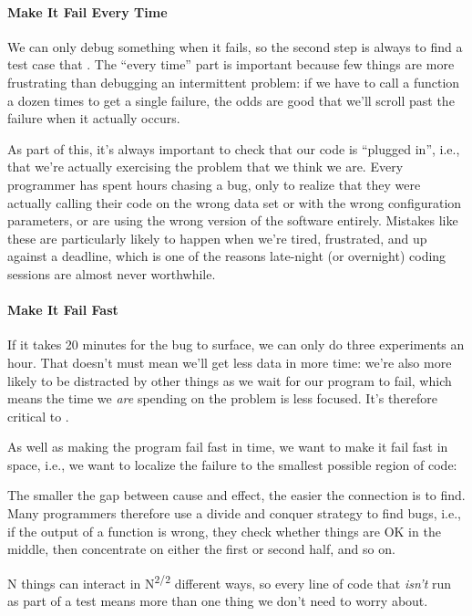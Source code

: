 \documentclass{book}
\begin{document}
\mbox{}\paragraph{Make It Fail Every Time}

We can only debug something when it fails, so the second step is always
to find a test case that
. The ``every time'' part is important because few things are more
frustrating than debugging an intermittent problem: if we have to call a
function a dozen times to get a single failure, the odds are good that
we'll scroll past the failure when it actually occurs.

As part of this, it's always important to check that our code is
``plugged in'', i.e., that we're actually exercising the problem that we
think we are. Every programmer has spent hours chasing a bug, only to
realize that they were actually calling their code on the wrong data set
or with the wrong configuration parameters, or are using the wrong
version of the software entirely. Mistakes like these are particularly
likely to happen when we're tired, frustrated, and up against a
deadline, which is one of the reasons late-night (or overnight) coding
sessions are almost never worthwhile.

\mbox{}\paragraph{Make It Fail Fast}

If it takes 20 minutes for the bug to surface, we can only do three
experiments an hour. That doesn't must mean we'll get less data in more
time: we're also more likely to be distracted by other things as we wait
for our program to fail, which means the time we \emph{are} spending on
the problem is less focused. It's therefore critical to
.

As well as making the program fail fast in time, we want to make it fail
fast in space, i.e., we want to localize the failure to the smallest
possible region of code:

\begin{swcenumerate}
\item
  The smaller the gap between cause and effect, the easier the
  connection is to find. Many programmers therefore use a divide and
  conquer strategy to find bugs, i.e., if the output of a function is
  wrong, they check whether things are OK in the middle, then
  concentrate on either the first or second half, and so on.
\item
  N things can interact in N\textsuperscript{2/2} different ways, so
  every line of code that \emph{isn't} run as part of a test means more
  than one thing we don't need to worry about.
\end{swcenumerate}
\end{document}
